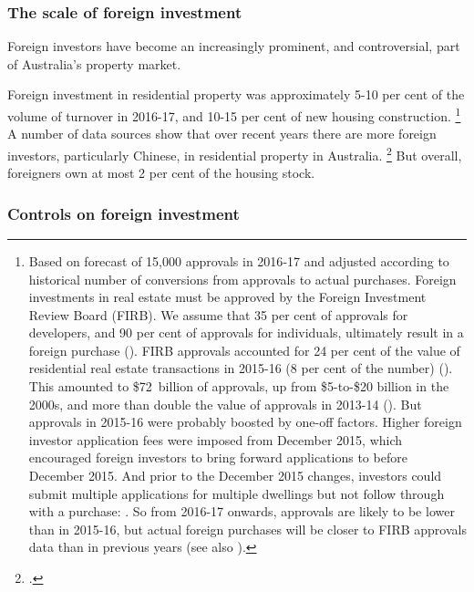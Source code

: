 \subsubsection{The scale of foreign investment}\label{subsec:scale-foreign-investment}

Foreign investors have become an increasingly prominent, and controversial, part of Australia's property market.

Foreign investment in residential property was  approximately 5-10 per cent of the volume of turnover in 2016-17, and 10-15 per cent of new housing construction.%
	\footnote{Based on \textcite{Fraser2017stockbroker} forecast of 15,000 approvals in 2016‑17 and adjusted according to historical number of conversions from approvals to actual purchases.
	Foreign investments in real estate must be approved by the Foreign Investment Review Board (FIRB).
	We assume that 35 per cent of approvals for developers, and 90 per cent of approvals for individuals, ultimately result in a foreign purchase (\textcite[][]{GauderHoussardOrsmond}).
    FIRB approvals accounted for 24 per cent of the value of residential real estate transactions in 2015-16 (8 per cent of the number) (\textcite{FIRB2015factsheet}).
    This amounted to \$72~billion of approvals, up from \$5-to-\$20 billion in the 2000s, and more than double the value of approvals in 2013-14 (\textcites{ABS-2017-Residential}{HassanEconomicUpdate}).
    But approvals in 2015-16 were probably boosted by one-off factors.
    Higher foreign investor application fees were imposed from December 2015, which encouraged foreign investors to bring forward applications to before December 2015.
    And prior to the December 2015 changes, investors could submit multiple applications for multiple dwellings but  not follow through with a purchase: \textcite[][13]{GauderHoussardOrsmond}.
	So from 2016-17 onwards, approvals are likely to be lower than in 2015-16, but actual foreign purchases will be closer to FIRB approvals data than in previous years (see also \textcite{Kearns2017ausproperty}).}
A number of data sources show that over recent years there are more foreign investors, particularly Chinese, in residential property in Australia.
    \footcites{NAB2017}{SMHAusHousing}[][Box~B]{RBAFinancialStability2016}{JandaForeigners}
But overall, foreigners own at most 2 per cent of the housing stock.%

\subsubsection{Controls on foreign investment}\label{subsec:controls-foreign-investment}

